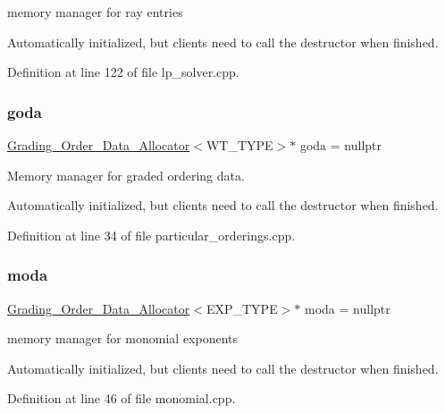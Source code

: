 memory manager for ray entries 

Automatically initialized, but clients need to call the destructor when finished. 

Definition at line 122 of file lp\+\_\+solver.\+cpp.

\mbox{\label{group__memorygroup_gadf1bccf09eada41d10a5d4ceda7ca479}} 
\subsubsection{\texorpdfstring{goda}{goda}}
{\footnotesize\ttfamily \hyperlink{group__memorygroup_class_grading___order___data___allocator}{Grading\+\_\+\+Order\+\_\+\+Data\+\_\+\+Allocator}$<$W\+T\+\_\+\+T\+Y\+PE$>$$\ast$ goda = nullptr}



Memory manager for graded ordering data. 

Automatically initialized, but clients need to call the destructor when finished. 

Definition at line 34 of file particular\+\_\+orderings.\+cpp.

\mbox{\label{group__memorygroup_gaf2c367d23e09c5dad7e0273995a3304c}} 
\subsubsection{\texorpdfstring{moda}{moda}}
{\footnotesize\ttfamily \hyperlink{group__memorygroup_class_grading___order___data___allocator}{Grading\+\_\+\+Order\+\_\+\+Data\+\_\+\+Allocator}$<$E\+X\+P\+\_\+\+T\+Y\+PE$>$$\ast$ moda = nullptr}



memory manager for monomial exponents 

Automatically initialized, but clients need to call the destructor when finished. 

Definition at line 46 of file monomial.\+cpp.

\mbox{\label{group__memorygroup_ga76b5ae808895658b417e3f3a13c60e51}} 
